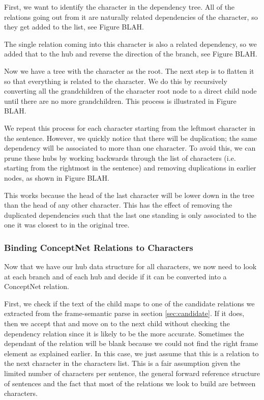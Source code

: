First, we want to identify the character in the dependency tree. All of the relations going out from it are naturally related dependencies of the character, so they get added to the list, see Figure BLAH.

The single relation coming into this character is also a related dependency, so we added that to the hub and reverse the direction of the branch, see Figure BLAH.

Now we have a tree with the character as the root. The next step is to flatten it so that everything is related to the character. We do this by recursively converting all the grandchildren of the character root node to a direct child node until there are no more grandchildren. This process is illustrated in Figure BLAH.

We repeat this process for each character starting from the leftmost character in the sentence. However, we quickly notice that there will be duplication; the same dependency will be associated to more than one character. To avoid this, we can prune these hubs by working backwards through the list of characters (i.e. starting from the rightmost in the sentence) and removing duplications in earlier nodes, as shown in Figure BLAH. 

This works because the head of the last character will be lower down in the tree than the head of any other character. This has the effect of removing the duplicated dependencies such that the last one standing is only associated to the one it was closest to in the original tree.


\subsubsection{Binding ConceptNet Relations to Characters}
	
Now that we have our hub data structure for all characters, we now need to look at each branch and of each hub and decide if it can be converted into a ConceptNet relation.

First, we check if the text of the child maps to one of the candidate relations we extracted from the frame-semantic parse in section \ref{sec:candidate}. If it does, then we accept that and move on to the next child without checking the dependency relation since it is likely to be the more accurate. Sometimes the dependant of the relation will be blank because we could not find the right frame element as explained earlier. In this case, we just assume that this is a relation to the next character in the characters list. This is a fair assumption given the limited number of characters per sentence, the general forward reference structure of sentences and the fact that most of the relations we look to build are between characters.

